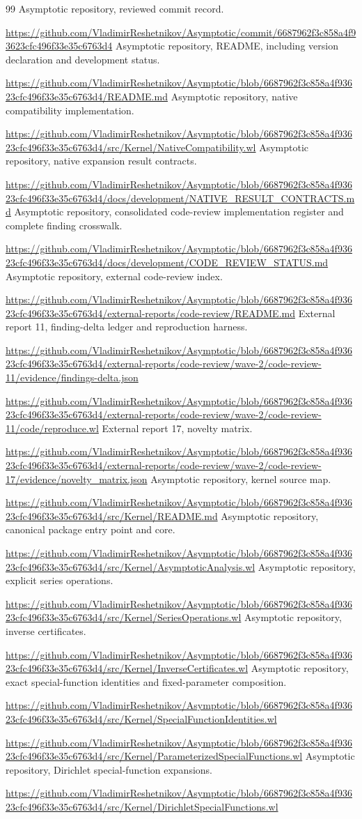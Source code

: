 \documentclass[11pt]{article}
\newcommand{\srcurl}[1]{\url{https://github.com/VladimirReshetnikov/Asymptotic/blob/6687962f3c858a4f93623cfc496f33e35c6763d4/#1}}
\begin{document}
\begin{thebibliography}{99}
\small
{} Asymptotic repository, reviewed commit record.\par
\url{https://github.com/VladimirReshetnikov/Asymptotic/commit/6687962f3c858a4f93623cfc496f33e35c6763d4}
 Asymptotic repository, README, including version declaration and development status.\par\srcurl{README.md}
 Asymptotic repository, native compatibility implementation.\par\srcurl{src/Kernel/NativeCompatibility.wl}
 Asymptotic repository, native expansion result contracts.\par\srcurl{docs/development/NATIVE_RESULT_CONTRACTS.md}
 Asymptotic repository, consolidated code-review implementation register and complete finding crosswalk.\par\srcurl{docs/development/CODE_REVIEW_STATUS.md}
 Asymptotic repository, external code-review index.\par\srcurl{external-reports/code-review/README.md}
 External report 11, finding-delta ledger and reproduction harness.\par\srcurl{external-reports/code-review/wave-2/code-review-11/evidence/findings-delta.json}\par\srcurl{external-reports/code-review/wave-2/code-review-11/code/reproduce.wl}
 External report 17, novelty matrix.\par\srcurl{external-reports/code-review/wave-2/code-review-17/evidence/novelty_matrix.json}
 Asymptotic repository, kernel source map.\par\srcurl{src/Kernel/README.md}
 Asymptotic repository, canonical package entry point and core.\par\srcurl{src/Kernel/AsymptoticAnalysis.wl}
 Asymptotic repository, explicit series operations.\par\srcurl{src/Kernel/SeriesOperations.wl}
 Asymptotic repository, inverse certificates.\par\srcurl{src/Kernel/InverseCertificates.wl}
 Asymptotic repository, exact special-function identities and fixed-parameter composition.\par\srcurl{src/Kernel/SpecialFunctionIdentities.wl}\par\srcurl{src/Kernel/ParameterizedSpecialFunctions.wl}
 Asymptotic repository, Dirichlet special-function expansions.\par\srcurl{src/Kernel/DirichletSpecialFunctions.wl}

\end{thebibliography}
\end{document}
